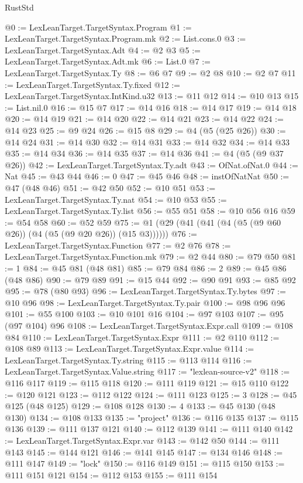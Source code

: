 \begin{lexlean}{RustStd}
\begin{coremodule}
@0 := LexLeanTarget.TargetSyntax.Program
@1 := LexLeanTarget.TargetSyntax.Program.mk
@2 := List.cons.{0}
@3 := LexLeanTarget.TargetSyntax.Adt
@4 := @2 @3
@5 := LexLeanTarget.TargetSyntax.Adt.mk
@6 := List.{0}
@7 := LexLeanTarget.TargetSyntax.Ty
@8 := @6 @7
@9 := @2 @8
@10 := @2 @7
@11 := LexLeanTarget.TargetSyntax.Ty.fixed
@12 := LexLeanTarget.TargetSyntax.IntKind.u32
@13 := @11 @12
@14 := @10 @13
@15 := List.nil.{0}
@16 := @15 @7
@17 := @14 @16
@18 := @14 @17
@19 := @14 @18
@20 := @14 @19
@21 := @14 @20
@22 := @14 @21
@23 := @14 @22
@24 := @14 @23
@25 := @9 @24
@26 := @15 @8
@29 := @4 (@5 (@25 @26))
@30 := @14 @24
@31 := @14 @30
@32 := @14 @31
@33 := @14 @32
@34 := @14 @33
@35 := @14 @34
@36 := @14 @35
@37 := @14 @36
@41 := @4 (@5 (@9 @37 @26))
@42 := LexLeanTarget.TargetSyntax.Ty.adt
@43 := OfNat.ofNat.{0}
@44 := Nat
@45 := @43 @44
@46 := 0
@47 := @45 @46
@48 := instOfNatNat
@50 := @47 (@48 @46)
@51 := @42 @50
@52 := @10 @51
@53 := LexLeanTarget.TargetSyntax.Ty.nat
@54 := @10 @53
@55 := LexLeanTarget.TargetSyntax.Ty.list
@56 := @55 @51
@58 := @10 @56 @16
@59 := @54 @58
@60 := @52 @59
@75 := @1 (@29 (@41 (@41 (@4 (@5 (@9 @60 @26)) (@4 (@5 (@9 @20 @26)) (@15 @3))))))
@76 := LexLeanTarget.TargetSyntax.Function
@77 := @2 @76
@78 := LexLeanTarget.TargetSyntax.Function.mk
@79 := @2 @44
@80 := @79 @50
@81 := 1
@84 := @45 @81 (@48 @81)
@85 := @79 @84
@86 := 2
@89 := @45 @86 (@48 @86)
@90 := @79 @89
@91 := @15 @44
@92 := @90 @91
@93 := @85 @92
@95 := @78 (@80 @93)
@96 := LexLeanTarget.TargetSyntax.Ty.bytes
@97 := @10 @96
@98 := LexLeanTarget.TargetSyntax.Ty.pair
@100 := @98 @96 @96
@101 := @55 @100
@103 := @10 @101 @16
@104 := @97 @103
@107 := @95 (@97 @104) @96
@108 := LexLeanTarget.TargetSyntax.Expr.call
@109 := @108 @84
@110 := LexLeanTarget.TargetSyntax.Expr
@111 := @2 @110
@112 := @108 @89
@113 := LexLeanTarget.TargetSyntax.Expr.value
@114 := LexLeanTarget.TargetSyntax.Ty.string
@115 := @113 @114
@116 := LexLeanTarget.TargetSyntax.Value.string
@117 := "lexlean-source-v2"
@118 := @116 @117
@119 := @115 @118
@120 := @111 @119
@121 := @15 @110
@122 := @120 @121
@123 := @112 @122
@124 := @111 @123
@125 := 3
@128 := @45 @125 (@48 @125)
@129 := @108 @128
@130 := 4
@133 := @45 @130 (@48 @130)
@134 := @108 @133
@135 := "project"
@136 := @116 @135
@137 := @115 @136
@139 := @111 @137 @121
@140 := @112 @139
@141 := @111 @140
@142 := LexLeanTarget.TargetSyntax.Expr.var
@143 := @142 @50
@144 := @111 @143
@145 := @144 @121
@146 := @141 @145
@147 := @134 @146
@148 := @111 @147
@149 := "lock"
@150 := @116 @149
@151 := @115 @150
@153 := @111 @151 @121
@154 := @112 @153
@155 := @111 @154

\end{coremodule}
\end{lexlean}
